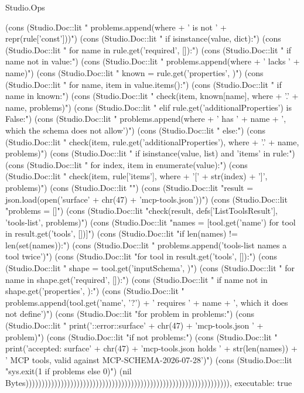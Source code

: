 \begin{lexlean}{Studio.Ops}
\begin{semanticmodule}
{{    (cons (Studio.Doc::lit "        problems.append(where + ' is not ' + repr(rule['const']))\n")
    (cons (Studio.Doc::lit "    if isinstance(value, dict):\n")
    (cons (Studio.Doc::lit "        for name in rule.get('required', []):\n")
    (cons (Studio.Doc::lit "            if name not in value:\n")
    (cons (Studio.Doc::lit "                problems.append(where + ' lacks ' + name)\n")
    (cons (Studio.Doc::lit "        known = rule.get('properties', {})\n")
    (cons (Studio.Doc::lit "        for name, item in value.items():\n")
    (cons (Studio.Doc::lit "            if name in known:\n")
    (cons (Studio.Doc::lit "                check(item, known[name], where + '.' + name, problems)\n")
    (cons (Studio.Doc::lit "            elif rule.get('additionalProperties') is False:\n")
    (cons (Studio.Doc::lit "                problems.append(where + ' has ' + name + ', which the schema does not allow')\n")
    (cons (Studio.Doc::lit "            else:\n")
    (cons (Studio.Doc::lit "                check(item, rule.get('additionalProperties'), where + '.' + name, problems)\n")
    (cons (Studio.Doc::lit "    if isinstance(value, list) and 'items' in rule:\n")
    (cons (Studio.Doc::lit "        for index, item in enumerate(value):\n")
    (cons (Studio.Doc::lit "            check(item, rule['items'], where + '[' + str(index) + ']', problems)\n")
    (cons (Studio.Doc::lit "\n")
    (cons (Studio.Doc::lit "result = json.load(open('surface' + chr(47) + 'mcp-tools.json'))\n")
    (cons (Studio.Doc::lit "problems = []\n")
    (cons (Studio.Doc::lit "check(result, defs['ListToolsResult'], 'tools-list', problems)\n")
    (cons (Studio.Doc::lit "names = [tool.get('name') for tool in result.get('tools', [])]\n")
    (cons (Studio.Doc::lit "if len(names) != len(set(names)):\n")
    (cons (Studio.Doc::lit "    problems.append('tools-list names a tool twice')\n")
    (cons (Studio.Doc::lit "for tool in result.get('tools', []):\n")
    (cons (Studio.Doc::lit "    shape = tool.get('inputSchema', {})\n")
    (cons (Studio.Doc::lit "    for name in shape.get('required', []):\n")
    (cons (Studio.Doc::lit "        if name not in shape.get('properties', {}):\n")
    (cons (Studio.Doc::lit "            problems.append(tool.get('name', '?') + ' requires ' + name + ', which it does not define')\n")
    (cons (Studio.Doc::lit "for problem in problems:\n")
    (cons (Studio.Doc::lit "    print('::error::surface' + chr(47) + 'mcp-tools.json ' + problem)\n")
    (cons (Studio.Doc::lit "if not problems:\n")
    (cons (Studio.Doc::lit "    print('accepted: surface' + chr(47) + 'mcp-tools.json holds ' + str(len(names)) + ' MCP tools, valid against MCP-SCHEMA-2026-07-28')\n")
    (cons (Studio.Doc::lit "sys.exit(1 if problems else 0)\n")
    (nil Bytes)))))))))))))))))))))))))))))))))))))))))))))))))))))))))))))))),
  executable: true
}

}
\end{semanticmodule}
\end{lexlean}
